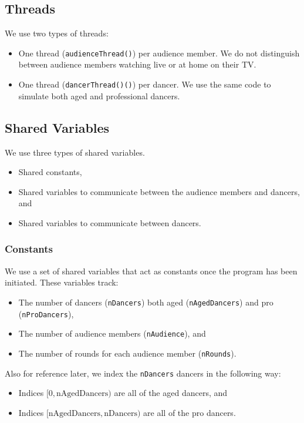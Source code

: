 \documentclass[12pt,a4paper]{scrartcl}
\begin{document}
\subsection{Threads}
We use two types of threads:
\begin{itemize}
    \item One thread (\texttt{audienceThread()}) per audience member.
          We do not distinguish between audience members watching live or at home on their TV.
    \item One thread (\texttt{dancerThread()()}) per dancer.
          We use the same code to simulate both aged and professional dancers.
\end{itemize}

\subsection{Shared Variables}
We use three types of shared variables.
\begin{itemize}
    \item Shared constants,
    \item Shared variables to communicate between the audience members and dancers, and
    \item Shared variables to communicate between dancers.
\end{itemize}

\subsubsection{Constants}
We use a set of shared variables that act as constants once the program has been initiated.
These variables track:
\begin{itemize}
    \item The number of dancers (\texttt{nDancers}) both aged (\texttt{nAgedDancers}) and pro (\texttt{nProDancers}),
    \item The number of audience members (\texttt{nAudience}), and
    \item The number of rounds for each audience member (\texttt{nRounds}).
\end{itemize}
Also for reference later, we index the \texttt{nDancers} dancers in the following way:
\begin{itemize}
    \item Indices $[0, \textrm{nAgedDancers})$ are all of the aged dancers, and
    \item Indices $[\textrm{nAgedDancers}, \textrm{nDancers})$ are all of the pro dancers.
\end{itemize}
\end{document}
